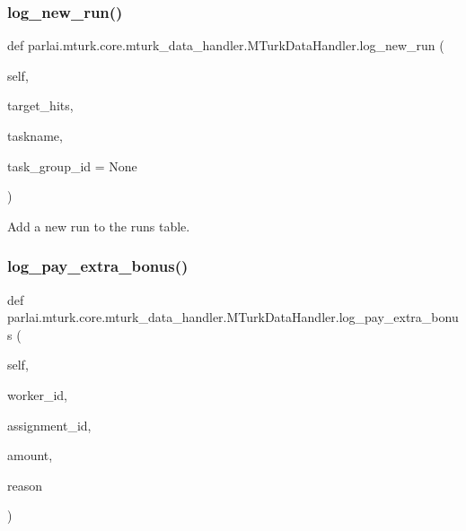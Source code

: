 \subsubsection{\texorpdfstring{log\+\_\+new\+\_\+run()}{log\_new\_run()}}
{\footnotesize\ttfamily def parlai.\+mturk.\+core.\+mturk\+\_\+data\+\_\+handler.\+M\+Turk\+Data\+Handler.\+log\+\_\+new\+\_\+run (\begin{DoxyParamCaption}\item[{}]{self,  }\item[{}]{target\+\_\+hits,  }\item[{}]{taskname,  }\item[{}]{task\+\_\+group\+\_\+id = {\ttfamily None} }\end{DoxyParamCaption})}

\begin{DoxyVerb}Add a new run to the runs table.
\end{DoxyVerb}
 \mbox{\label{classparlai_1_1mturk_1_1core_1_1mturk__data__handler_1_1MTurkDataHandler_a8924cb67f6d2e884091eadc0235dd209}} 
\subsubsection{\texorpdfstring{log\+\_\+pay\+\_\+extra\+\_\+bonus()}{log\_pay\_extra\_bonus()}}
{\footnotesize\ttfamily def parlai.\+mturk.\+core.\+mturk\+\_\+data\+\_\+handler.\+M\+Turk\+Data\+Handler.\+log\+\_\+pay\+\_\+extra\+\_\+bonus (\begin{DoxyParamCaption}\item[{}]{self,  }\item[{}]{worker\+\_\+id,  }\item[{}]{assignment\+\_\+id,  }\item[{}]{amount,  }\item[{}]{reason }\end{DoxyParamCaption})}

